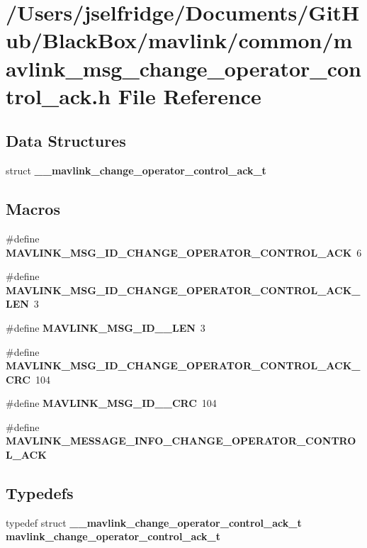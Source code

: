 \section{/\+Users/jselfridge/\+Documents/\+Git\+Hub/\+Black\+Box/mavlink/common/mavlink\+\_\+msg\+\_\+change\+\_\+operator\+\_\+control\+\_\+ack.h File Reference}
\label{mavlink__msg__change__operator__control__ack_8h}
\subsection*{Data Structures}
\begin{DoxyCompactItemize}
\item 
struct \textbf{ \+\_\+\+\_\+mavlink\+\_\+change\+\_\+operator\+\_\+control\+\_\+ack\+\_\+t}
\end{DoxyCompactItemize}
\subsection*{Macros}
\begin{DoxyCompactItemize}
\item 
\#define \textbf{ M\+A\+V\+L\+I\+N\+K\+\_\+\+M\+S\+G\+\_\+\+I\+D\+\_\+\+C\+H\+A\+N\+G\+E\+\_\+\+O\+P\+E\+R\+A\+T\+O\+R\+\_\+\+C\+O\+N\+T\+R\+O\+L\+\_\+\+A\+CK}~6
\item 
\#define \textbf{ M\+A\+V\+L\+I\+N\+K\+\_\+\+M\+S\+G\+\_\+\+I\+D\+\_\+\+C\+H\+A\+N\+G\+E\+\_\+\+O\+P\+E\+R\+A\+T\+O\+R\+\_\+\+C\+O\+N\+T\+R\+O\+L\+\_\+\+A\+C\+K\+\_\+\+L\+EN}~3
\item 
\#define \textbf{ M\+A\+V\+L\+I\+N\+K\+\_\+\+M\+S\+G\+\_\+\+I\+D\+\_\+\_\+\+L\+EN}~3
\item 
\#define \textbf{ M\+A\+V\+L\+I\+N\+K\+\_\+\+M\+S\+G\+\_\+\+I\+D\+\_\+\+C\+H\+A\+N\+G\+E\+\_\+\+O\+P\+E\+R\+A\+T\+O\+R\+\_\+\+C\+O\+N\+T\+R\+O\+L\+\_\+\+A\+C\+K\+\_\+\+C\+RC}~104
\item 
\#define \textbf{ M\+A\+V\+L\+I\+N\+K\+\_\+\+M\+S\+G\+\_\+\+I\+D\+\_\+\_\+\+C\+RC}~104
\item 
\#define \textbf{ M\+A\+V\+L\+I\+N\+K\+\_\+\+M\+E\+S\+S\+A\+G\+E\+\_\+\+I\+N\+F\+O\+\_\+\+C\+H\+A\+N\+G\+E\+\_\+\+O\+P\+E\+R\+A\+T\+O\+R\+\_\+\+C\+O\+N\+T\+R\+O\+L\+\_\+\+A\+CK}
\end{DoxyCompactItemize}
\subsection*{Typedefs}
\begin{DoxyCompactItemize}
\item 
typedef struct \textbf{ \+\_\+\+\_\+mavlink\+\_\+change\+\_\+operator\+\_\+control\+\_\+ack\+\_\+t} \textbf{ mavlink\+\_\+change\+\_\+operator\+\_\+control\+\_\+ack\+\_\+t}
\end{DoxyCompactItemize}


